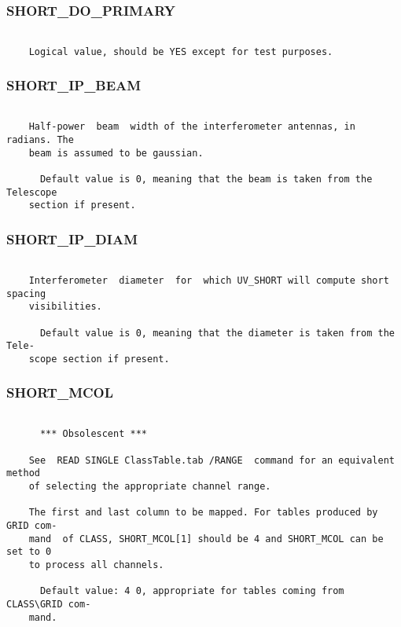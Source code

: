 \subsubsection{SHORT\_DO\_PRIMARY}
\begin{verbatim}

    Logical value, should be YES except for test purposes.

\end{verbatim}
\subsubsection{SHORT\_IP\_BEAM}
\begin{verbatim}

    Half-power  beam  width of the interferometer antennas, in  radians. The
    beam is assumed to be gaussian.

      Default value is 0, meaning that the beam is taken from the  Telescope
    section if present.

\end{verbatim}
\subsubsection{SHORT\_IP\_DIAM}
\begin{verbatim}

    Interferometer  diameter  for  which UV_SHORT will compute short spacing
    visibilities.

      Default value is 0, meaning that the diameter is taken from the  Tele-
    scope section if present.

\end{verbatim}
\subsubsection{SHORT\_MCOL}
\begin{verbatim}

      *** Obsolescent ***

    See  READ SINGLE ClassTable.tab /RANGE  command for an equivalent method
    of selecting the appropriate channel range.

    The first and last column to be mapped. For tables produced by GRID com-
    mand  of CLASS, SHORT_MCOL[1] should be 4 and SHORT_MCOL can be set to 0
    to process all channels.

      Default value: 4 0, appropriate for tables coming from CLASS\GRID com-
    mand.


\end{verbatim}
